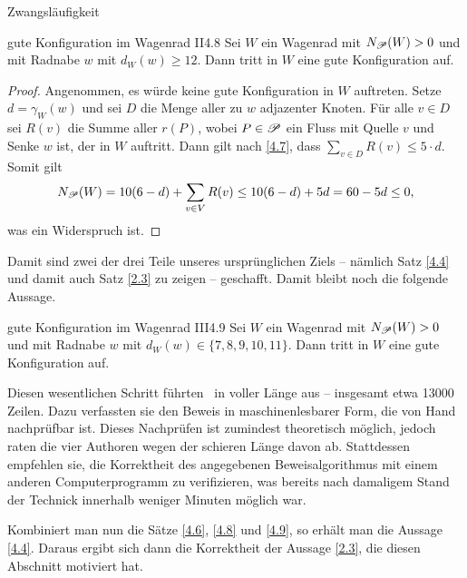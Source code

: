 \begin{section}{Zwangsläufigkeit}
 \begin{satzl}{gute Konfiguration im Wagenrad II}{4.8}
  Sei $W$ ein Wagenrad mit $N_{\mathscr{P}}(W) > 0$ und mit Radnabe $w$ mit $d_W(w) \geq 12$. Dann tritt in $W$ eine gute Konfiguration auf.
 \end{satzl}
 
 \begin{proof}
  Angenommen, es würde keine gute Konfiguration in $W$ auftreten. Setze $d = \gamma_W(w)$ und sei $D$ die Menge aller zu $w$ adjazenter Knoten. Für alle $v \in D$ sei $R(v)$ die Summe aller $r(P)$, wobei $P \in \mathscr{P}$ ein Fluss mit Quelle $v$ und Senke $w$ ist, der in $W$ auftritt. Dann gilt nach \ref{4.7}, dass $\sum_{v \in D} R(v) \leq 5\cdot d$. Somit gilt
  \[ N_{\mathscr{P}}(W) = 10(6-d) + \sum_{v \in V} R(v) \leq 10(6-d) + 5d = 60 - 5d \leq 0 \text{,}\]
  was ein Widerspruch ist.
 \end{proof}

 Damit sind zwei der drei Teile unseres ursprünglichen Ziels -- nämlich Satz \ref{4.4} und damit auch Satz \ref{2.3} zu zeigen -- geschafft. Damit bleibt noch die folgende Aussage.

 \begin{satzl}{gute Konfiguration im Wagenrad III}{4.9}
  Sei $W$ ein Wagenrad mit $N_{\mathscr{P}}(W) > 0$ und mit Radnabe $w$ mit $d_W(w) \in \{7,8,9,10,11\}$. Dann tritt in $W$ eine gute Konfiguration auf.
 \end{satzl}
 
 Diesen wesentlichen Schritt führten \rsst\-\ in voller Länge aus -- insgesamt etwa 13000 Zeilen. Dazu verfassten sie den Beweis in maschinenlesbarer Form, die von Hand nachprüfbar ist. Dieses Nachprüfen ist zumindest theoretisch möglich, jedoch raten die vier Authoren wegen der schieren Länge davon ab. Stattdessen empfehlen sie, die Korrektheit des angegebenen Beweisalgorithmus mit einem anderen Computerprogramm zu verifizieren, was bereits nach damaligem Stand der Technick innerhalb weniger Minuten möglich war.

 Kombiniert man nun die Sätze \ref{4.6}, \ref{4.8} und \ref{4.9}, so erhält man die Aussage \ref{4.4}. Daraus ergibt sich dann die Korrektheit der Aussage \ref{2.3}, die diesen Abschnitt motiviert hat.
\end{section}